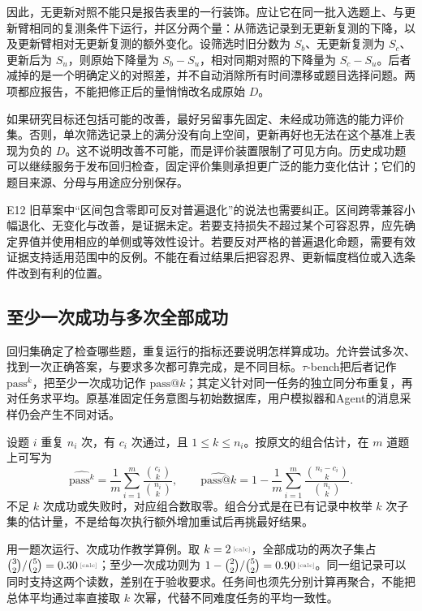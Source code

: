因此，无更新对照不能只是报告表里的一行装饰。应让它在同一批入选题上、与更新臂相同的复测条件下运行，并区分两个量：从筛选记录到无更新复测的下降，以及更新臂相对无更新复测的额外变化。设筛选时旧分数为 $S_b$、无更新复测为 $S_c$、更新后为 $S_u$，则原始下降量为 $S_b-S_u$，相对同期对照的下降量为 $S_c-S_u$。后者减掉的是一个明确定义的对照差，并不自动消除所有时间漂移或题目选择问题。两项都应报告，不能把修正后的量悄悄改名成原始 $D$。

如果研究目标还包括可能的改善，最好另留事先固定、未经成功筛选的能力评价集。否则，单次筛选记录上的满分没有向上空间，更新再好也无法在这个基准上表现为负的 $D$。这不说明改善不可能，而是评价装置限制了可见方向。历史成功题可以继续服务于发布回归检查，固定评价集则承担更广泛的能力变化估计；它们的题目来源、分母与用途应分别保存。

E12 旧草案中“区间包含零即可反对普遍退化”的说法也需要纠正。区间跨零兼容小幅退化、无变化与改善，是证据未定。若要支持损失不超过某个可容忍界，应先确定界值并使用相应的单侧或等效性设计。若要反对严格的普遍退化命题，需要有效证据支持适用范围中的反例。不能在看过结果后把容忍界、更新幅度档位或入选条件改到有利的位置。

\subsection{至少一次成功与多次全部成功}
\label{sec:ch14-repeat-consistency}

回归集确定了检查哪些题，重复运行的指标还要说明怎样算成功。允许尝试多次、找到一次正确答案，与要求多次都可靠完成，是不同目标。$\tau$-bench把后者记作 $\mathrm{pass}^{k}$，把至少一次成功记作 $\mathrm{pass}@k$；其定义针对同一任务的独立同分布重复，再对任务求平均\cite{tau-bench-2406}。原基准固定任务意图与初始数据库，用户模拟器和Agent的消息采样仍会产生不同对话。

设题 $i$ 重复 $n_i$ 次，有 $c_i$ 次通过，且 $1\le k\le n_i$。按原文的组合估计，在 $m$ 道题上可写为
\begin{equation}
 \widehat{\mathrm{pass}^{k}}=\frac1m\sum_{i=1}^{m}\frac{\binom{c_i}{k}}{\binom{n_i}{k}},\qquad
 \widehat{\mathrm{pass}@k}=1-\frac1m\sum_{i=1}^{m}\frac{\binom{n_i-c_i}{k}}{\binom{n_i}{k}}.
 \label{eq:ch14-consistency}
\end{equation}
不足 $k$ 次成功或失败时，对应组合数取零。组合分式是在已有记录中枚举 $k$ 次子集的估计量，不是给每次执行额外增加重试后再挑最好结果。

用一题次运行、次成功作教学算例。取 $k=\calcnum{2}$，全部成功的两次子集占 $\binom{3}{2}/\binom{5}{2}=\calcnum{0.30}$；至少一次成功则为 $1-\binom{2}{2}/\binom{5}{2}=\calcnum{0.90}$。同一组记录可以同时支持这两个读数，差别在于验收要求。任务间也须先分别计算再聚合，不能把总体平均通过率直接取 $k$ 次幂，代替不同难度任务的平均一致性。

